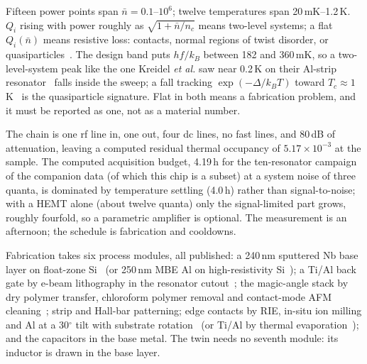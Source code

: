 \documentclass[aps,prb,reprint,superscriptaddress,longbibliography]{revtex4-2}
\begin{document}
Fifteen power points span $\bar n = 0.1$--$10^{6}$; twelve temperatures
span 20\,mK--1.2\,K. $Q_i$ rising with power roughly as $\sqrt{1 + \bar
n/n_c}$ means two-level systems; a flat $Q_i(\bar n)$ means resistive
loss: contacts, normal regions of twist disorder, or
quasiparticles~\cite{McRae2020}. The design band puts $hf/k_B$ between
182 and 360\,mK, so a two-level-system peak like the one Kreidel
\emph{et al.} saw near 0.2\,K on their Al-strip
resonator~\cite{Kreidel2024} falls inside the sweep; a fall tracking
$\exp(-\Delta/k_BT)$ toward $T_c \approx 1$\,K~\cite{Tanaka2025} is the
quasiparticle signature. Flat in both means a fabrication problem, and
it must be reported as one, not as a material number.

The chain is one rf line in, one out, four dc lines, no fast lines, and
80\,dB of attenuation, leaving a computed residual thermal occupancy of
$5.17 \times 10^{-3}$ at the sample. The computed acquisition budget,
4.19\,h for the ten-resonator campaign of the companion data (of which
this chip is a subset) at a system noise of three quanta, is dominated
by temperature settling (4.0\,h) rather than signal-to-noise; with a
HEMT alone (about twelve quanta) only the signal-limited part grows,
roughly fourfold, so a parametric amplifier is optional. The measurement is an afternoon; the
schedule is fabrication and cooldowns.

Fabrication takes six process modules, all published: a 240\,nm
sputtered Nb base layer on float-zone Si~\cite{Kreidel2024} (or 250\,nm
MBE Al on high-resistivity Si~\cite{Zaman2026}); a Ti/Al back gate by
e-beam lithography in the resonator cutout~\cite{Tanaka2025}; the
magic-angle stack by dry polymer transfer, chloroform polymer removal
and contact-mode AFM cleaning~\cite{Tanaka2025}; strip and Hall-bar
patterning; edge contacts by RIE, in-situ ion milling and Al at a
30$^\circ$ tilt with substrate rotation~\cite{Zaman2026} (or Ti/Al by
thermal evaporation~\cite{Tanaka2025}); and the capacitors in the base
metal. The twin needs no seventh module: its inductor is drawn in the
base layer.
\end{document}
